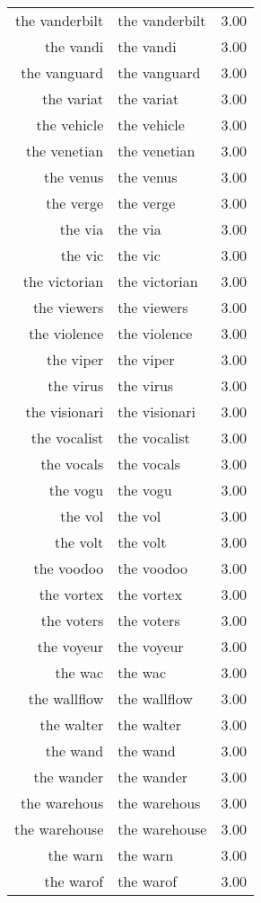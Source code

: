 \begin{table}[ht]
\begin{tabular}{rlr}
  the vanderbilt & the vanderbilt & 3.00 \\ 
  the vandi & the vandi & 3.00 \\ 
  the vanguard & the vanguard & 3.00 \\ 
  the variat & the variat & 3.00 \\ 
  the vehicle & the vehicle & 3.00 \\ 
  the venetian & the venetian & 3.00 \\ 
  the venus & the venus & 3.00 \\ 
  the verge & the verge & 3.00 \\ 
  the via & the via & 3.00 \\ 
  the vic & the vic & 3.00 \\ 
  the victorian & the victorian & 3.00 \\ 
  the viewers & the viewers & 3.00 \\ 
  the violence & the violence & 3.00 \\ 
  the viper & the viper & 3.00 \\ 
  the virus & the virus & 3.00 \\ 
  the visionari & the visionari & 3.00 \\ 
  the vocalist & the vocalist & 3.00 \\ 
  the vocals & the vocals & 3.00 \\ 
  the vogu & the vogu & 3.00 \\ 
  the vol & the vol & 3.00 \\ 
  the volt & the volt & 3.00 \\ 
  the voodoo & the voodoo & 3.00 \\ 
  the vortex & the vortex & 3.00 \\ 
  the voters & the voters & 3.00 \\ 
  the voyeur & the voyeur & 3.00 \\ 
  the wac & the wac & 3.00 \\ 
  the wallflow & the wallflow & 3.00 \\ 
  the walter & the walter & 3.00 \\ 
  the wand & the wand & 3.00 \\ 
  the wander & the wander & 3.00 \\ 
  the warehous & the warehous & 3.00 \\ 
  the warehouse & the warehouse & 3.00 \\ 
  the warn & the warn & 3.00 \\ 
  the warof & the warof & 3.00 \\ 

\end{tabular}
\end{table}
